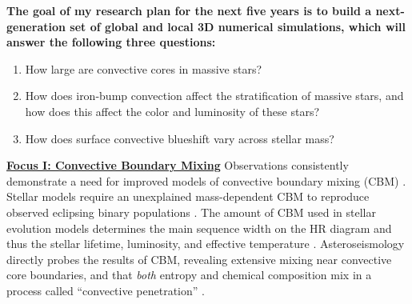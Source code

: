 \documentclass[12pt]{article}
\newcommand{\sct}[1]{\vspace{0.3cm}\hspace{-\parindent}\textbf{\underline{#1}}\hspace{0.3cm}}
\begin{document}
\textbf{The goal of my research plan for the next five years is to build a next-generation set of global and local 3D numerical simulations, which will answer the following three questions:}\vspace{-0.2cm}
\begin{enumerate}
    \item How large are convective cores in massive stars? \vspace{-0.2cm}
    \item How does iron-bump convection affect the stratification of massive stars, and how does this affect the color and luminosity of these stars?\vspace{-0.2cm}
    \item How does surface convective blueshift vary across stellar mass?\vspace{-0.2cm}
\end{enumerate}

\sct{Focus I: Convective Boundary Mixing}
Observations consistently demonstrate a need for improved models of convective boundary mixing (CBM) \citep{johnston2021}.
Stellar models require an unexplained mass-dependent CBM to reproduce observed eclipsing binary populations  \citep{claret_torres_2019}.
The amount of CBM used in stellar evolution models determines the main sequence width on the HR diagram and thus the stellar lifetime, luminosity, and effective temperature \citep{castro_etal_2014,higgins_vink_2019}.
Asteroseismology directly probes the results of CBM, revealing extensive mixing near convective core boundaries, and that \emph{both} entropy and chemical composition mix in a process called ``convective penetration'' \citep{michielsen_etal_2019, pedersen_etal_2021}.

\end{document}
